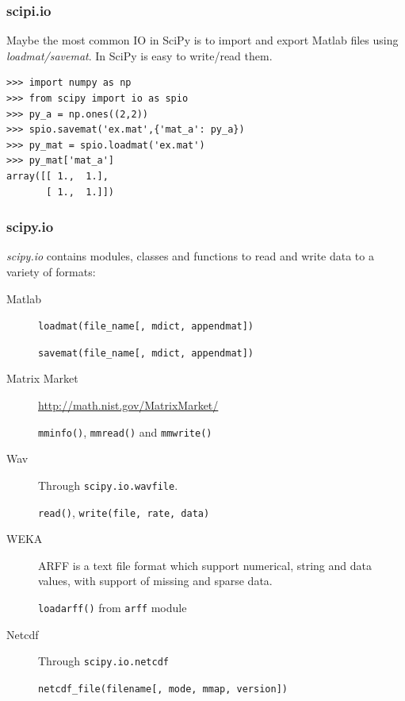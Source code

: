 \documentclass[10pt,colorlinks]{beamer}
\begin{document}
\begin{frame}[fragile]\frametitle{scipi.io}
Maybe the most common IO in SciPy is to import and export Matlab files using \emph{loadmat/savemat}. In SciPy is easy to write/read them. 
{\small
\begin{verbatim}
>>> import numpy as np
>>> from scipy import io as spio
>>> py_a = np.ones((2,2))
>>> spio.savemat('ex.mat',{'mat_a': py_a})
>>> py_mat = spio.loadmat('ex.mat')
>>> py_mat['mat_a']
array([[ 1.,  1.],
       [ 1.,  1.]])
\end{verbatim}

}
\end{frame}

\begin{frame}[fragile]\frametitle{scipy.io}
  \emph{scipy.io} contains modules, classes and functions to read and write data to a variety of formats: 
\begin{description}
    \item[Matlab] \verb|loadmat(file_name[, mdict, appendmat])|
    \item[] \verb|savemat(file_name[, mdict, appendmat])|
    \item[Matrix Market] \href{http://math.nist.gov/MatrixMarket/}{http://math.nist.gov/MatrixMarket/}
    \item[] \verb|mminfo()|, \verb|mmread()| and \verb|mmwrite()|
    \item[Wav] Through \verb|scipy.io.wavfile|.
    \item[] \verb|read()|, \verb|write(file, rate, data)|
    \item[WEKA] ARFF is a text file format which support numerical, string and data values, with support of missing and sparse data.
    \item[] \verb|loadarff()| from \verb|arff| module
    \item[Netcdf] Through \verb|scipy.io.netcdf|
    \item[]  \verb|netcdf_file(filename[, mode, mmap, version])|

\end{description}

\end{frame}
\end{document}
